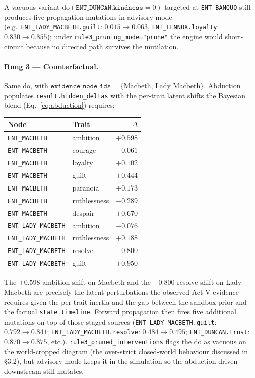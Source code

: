 \documentclass[11pt]{article}
\begin{document}
A vacuous variant
$\mathrm{do}(\texttt{ENT\_DUNCAN.kindness}{=}0)$ targeted at
\texttt{ENT\_BANQUO} still produces five propagation mutations in
advisory mode (e.g.\ \texttt{ENT\_LADY\_MACBETH.guilt}:
$0.015 \!\to\! 0.063$, \texttt{ENT\_LENNOX.loyalty}:
$0.830 \!\to\! 0.855$); under
\texttt{rule3\_pruning\_mode="prune"} the engine would
short-circuit because no directed path survives the mutilation.

\paragraph{Rung 3 --- Counterfactual.} Same do, with
$\texttt{evidence\_node\_ids}=\{$Macbeth, Lady Macbeth$\}$.
Abduction populates \texttt{result.hidden\_deltas} with the
per-trait latent shifts the Bayesian blend
(Eq.~\ref{eq:abduction}) requires:

\begin{table}[h]
\centering
\small
\begin{tabular}{llr}
\toprule
Node & Trait & $\Delta$ \\
\midrule
\texttt{ENT\_MACBETH}      & ambition     & $+0.598$ \\
\texttt{ENT\_MACBETH}      & courage      & $-0.061$ \\
\texttt{ENT\_MACBETH}      & loyalty      & $+0.102$ \\
\texttt{ENT\_MACBETH}      & guilt        & $+0.444$ \\
\texttt{ENT\_MACBETH}      & paranoia     & $+0.173$ \\
\texttt{ENT\_MACBETH}      & ruthlessness & $-0.289$ \\
\texttt{ENT\_MACBETH}      & despair      & $+0.670$ \\
\texttt{ENT\_LADY\_MACBETH} & ambition     & $-0.076$ \\
\texttt{ENT\_LADY\_MACBETH} & ruthlessness & $+0.188$ \\
\texttt{ENT\_LADY\_MACBETH} & resolve      & $-0.800$ \\
\texttt{ENT\_LADY\_MACBETH} & guilt        & $+0.950$ \\
\bottomrule
\end{tabular}
\end{table}

The $+0.598$ ambition shift on Macbeth and the $-0.800$ resolve
shift on Lady Macbeth are precisely the latent perturbations the
observed Act-V evidence requires given the per-trait inertia and
the gap between the sandbox prior and the factual
\texttt{state\_timeline}. Forward propagation then fires five
additional mutations on top of those staged sources
(\texttt{ENT\_LADY\_MACBETH.guilt}: $0.792 \!\to\! 0.841$;
\texttt{ENT\_LADY\_MACBETH.resolve}: $0.484 \!\to\! 0.495$;
\texttt{ENT\_DUNCAN.trust}: $0.870 \!\to\! 0.875$, etc.).
\texttt{rule3\_pruned\_interventions} flags the do as vacuous on
the world-cropped diagram (the over-strict closed-world
behaviour discussed in §3.2), but advisory mode keeps it in the
simulation so the abduction-driven downstream still mutates.
\end{document}
